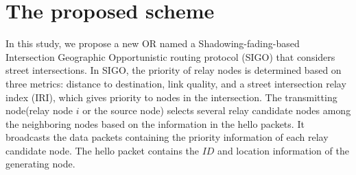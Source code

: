 \documentclass{comex}
\begin{document}
\section{The proposed scheme}
In this study, we propose a new OR named a Shadowing-fading-based Intersection Geographic Opportunistic routing protocol (SIGO) that considers street intersections. In SIGO, the priority of relay nodes is determined based on three metrics: distance to destination, link quality, and a street intersection relay index (IRI), which gives priority to nodes in the intersection. The transmitting node(relay node $i$ or the source node) selects several relay candidate nodes among the neighboring nodes based on the information in the hello packets.           
It  broadcasts the data packets containing the priority information of each relay candidate node. 
The hello packet contains the $ID$ and location information of the generating node.


 

\end{document}
